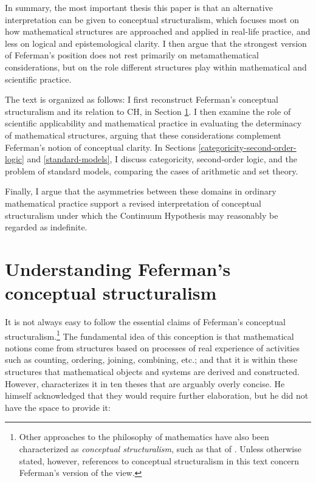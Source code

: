 \documentclass[11pt,a4paper]{book}
\theoremstyle{plain}
\begin{document}
In summary, the most important thesis this paper is that an alternative interpretation can be given to conceptual structuralism, which focuses most on how mathematical structures are approached and applied in real-life practice, and less on logical and epistemological clarity. I then argue that the strongest version of Feferman's position does not rest primarily on metamathematical considerations, but on the role different structures play within mathematical and scientific practice.

The text is organized as follows: I first reconstruct Feferman's conceptual structuralism and its relation to CH, in Section \ref{conceptual-structuralism-intro}. I then examine the role of scientific applicability and mathematical practice in evaluating the determinacy of mathematical structures, arguing that these considerations complement Feferman's notion of conceptual clarity. In Sections \ref{categoricity-second-order-logic} and \ref{standard-models}, I discuss categoricity, second-order logic, and the problem of standard models, comparing the cases of arithmetic and set theory. 

Finally, I argue that the asymmetries between these domains in ordinary mathematical practice support a revised interpretation of conceptual structuralism under which the Continuum Hypothesis may reasonably be regarded as indefinite.



\section{Understanding Feferman's conceptual structuralism}
\label{conceptual-structuralism-intro}

It is not always easy to follow the essential claims of Feferman's conceptual structuralism.\footnote{Other approaches to the philosophy of mathematics have also been characterized as \textit{conceptual structuralism}, such as that of \textcite[postnote]{Isaacson2008}. Unless otherwise stated, however, references to conceptual structuralism in this text concern Feferman's version of the view.} The fundamental idea of this conception is that mathematical notions come from structures based on processes of real experience of activities such as counting, ordering, joining, combining, etc.; and that it is within these structures that mathematical objects and systems are derived and constructed. However, \textcite{Feferman2011a} characterizes it in ten theses that are arguably overly concise. He himself acknowledged that they would require further elaboration, but he did not have the space to provide it:
\end{document}
